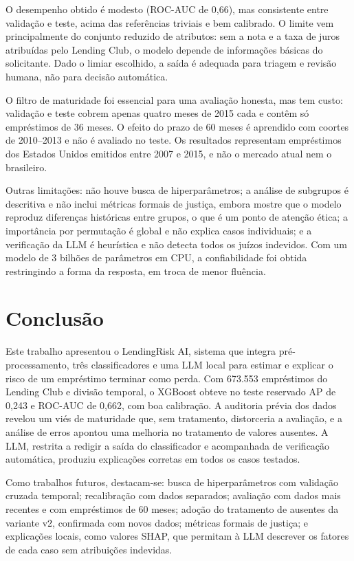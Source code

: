 \documentclass[12pt]{article}
\begin{document}
O desempenho obtido é modesto (ROC-AUC de 0,66), mas consistente entre
validação e teste, acima das referências triviais e bem calibrado. O limite vem
principalmente do conjunto reduzido de atributos: sem a nota e a taxa de juros
atribuídas pelo Lending Club, o modelo depende de informações básicas do
solicitante. Dado o limiar escolhido, a saída é adequada para triagem e revisão
humana, não para decisão automática.

O filtro de maturidade foi essencial para uma avaliação honesta, mas tem custo:
validação e teste cobrem apenas quatro meses de 2015 cada e contêm só
empréstimos de 36 meses. O efeito do prazo de 60 meses é aprendido com coortes de
2010--2013 e não é avaliado no teste. Os resultados representam empréstimos dos
Estados Unidos emitidos entre 2007 e 2015, e não o mercado atual nem o
brasileiro.

Outras limitações: não houve busca de hiperparâmetros; a análise de subgrupos é
descritiva e não inclui métricas formais de justiça, embora mostre que o modelo
reproduz diferenças históricas entre grupos, o que é um ponto de atenção ética;
a importância por permutação é global e não explica casos individuais; e a
verificação da LLM é heurística e não detecta todos os juízos indevidos. Com um
modelo de 3 bilhões de parâmetros em CPU, a confiabilidade foi obtida
restringindo a forma da resposta, em troca de menor fluência.


\section{Conclusão}\label{sec:conclusao}

Este trabalho apresentou o LendingRisk AI, sistema que integra
pré-processamento, três classificadores e uma LLM local para estimar e explicar o
risco de um empréstimo terminar como perda. Com 673.553 empréstimos do Lending
Club e divisão temporal, o XGBoost obteve no teste reservado AP de 0,243 e
ROC-AUC de 0,662, com boa calibração. A auditoria prévia dos dados revelou um viés
de maturidade que, sem tratamento, distorceria a avaliação, e a análise de erros
apontou uma melhoria no tratamento de valores ausentes. A LLM, restrita a redigir
a saída do classificador e acompanhada de verificação automática, produziu
explicações corretas em todos os casos testados.

Como trabalhos futuros, destacam-se: busca de hiperparâmetros com validação
cruzada temporal; recalibração com dados separados; avaliação com dados mais
recentes e com empréstimos de 60 meses; adoção do tratamento de ausentes da
variante v2, confirmada com novos dados; métricas formais de justiça; e
explicações locais, como valores SHAP, que permitam à LLM descrever os fatores de
cada caso sem atribuições indevidas.



\end{document}
